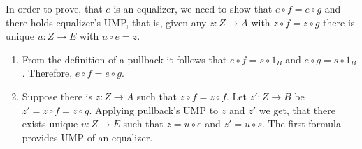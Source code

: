 \documentclass[12pt]{article}
\theoremstyle{definition}
\begin{document}
\begin{enumerate}
\begin{figure}[h!]
    \end{figure}

    In order to prove, that $e$ is an equalizer, we need to show that $e \circ f = e \circ g$ and there holds equalizer's UMP, that is, given any $z : Z \to A$ with $z \circ f = z \circ g$ there is unique $u : Z \to E$ with $u \circ e = z$.

    \begin{enumerate}
      \item From the definition of a pullback it follows that $e \circ f = s \circ 1_B$ and $e \circ g = s \circ 1_B$. Therefore, $e \circ f = e \circ g$.

      \item Suppose there is $z : Z \to A$ such that $z \circ f = z \circ f$. Let $z' : Z \to B$ be $z' = z \circ f = z \circ g$. Applying pullback's UMP to $z$ and $z'$ we get, that there exists unique $u : Z \to E$ such that $z = u \circ e$ and $z' = u \circ s$. The first formula provides UMP of an equalizer.
    \end{enumerate}

\end{enumerate}
\end{document}
